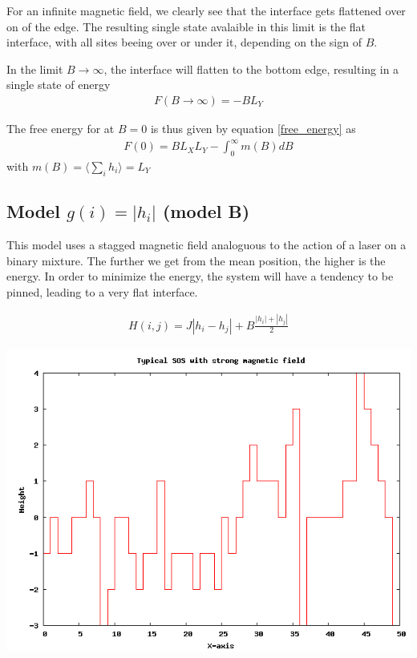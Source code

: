 For an infinite magnetic field, we clearly see that the interface gets flattened over on of the edge. The resulting single state avalaible in this limit is the flat interface, with all sites beeing over or under it, depending on the sign of $B$.

In the limit $B \rightarrow \infty$, the interface will flatten to the bottom edge, resulting in a single state of energy 
\begin{align}
  F(B \rightarrow \infty) = - B L_Y
\end{align}

The free energy for at $B=0$ is thus given by equation \ref{free_energy} as
\begin{align}
  F(0) = B L_X L_Y - \int_0^\infty m(B)dB
  \label{energymodela}
\end{align}
with $m(B) = \langle\sum_i h_i\rangle = L_Y$

\subsection{Model $g(i) = |h_i|$ (model B)}

This model uses a stagged magnetic field analoguous to the action of a laser on a binary mixture. The further we get from the mean position, the higher is the energy. In order to minimize the energy, the system will have a tendency to be pinned, leading to a very flat interface. 

\begin{align}
  H(i,j) = J |h_i-h_j| + B \frac{|h_i| + |h_j|}{2}
\end{align}

\includegraphics{tm/stagged.png}


